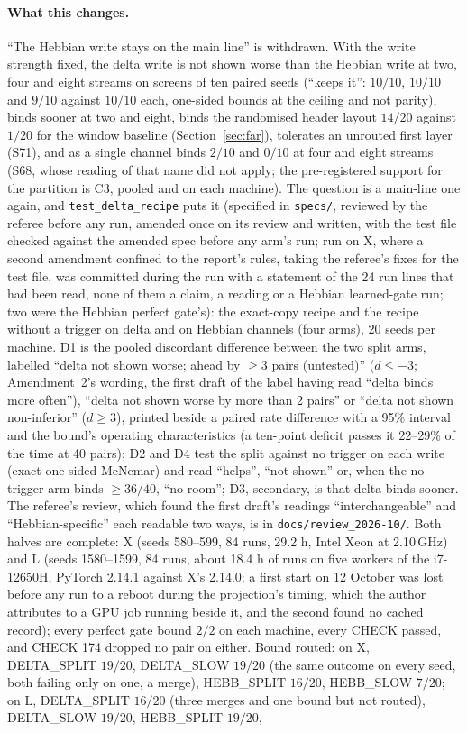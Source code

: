 \documentclass[11pt]{article}
\begin{document}
\paragraph{What this changes.} ``The Hebbian write stays on the main line'' is withdrawn. With the write strength fixed, the delta write is not shown worse than the Hebbian write at two, four and eight streams on screens of ten paired seeds (``keeps it'': $10/10$, $10/10$ and $9/10$ against $10/10$ each, one-sided bounds at the ceiling and not parity), binds sooner at two and eight, binds the randomised header layout $14/20$ against $1/20$ for the window baseline (Section~\ref{sec:far}), tolerates an unrouted first layer (S71), and as a single channel binds $2/10$ and $0/10$ at four and eight streams (S68, whose reading of that name did not apply; the pre-registered support for the partition is C3, pooled and on each machine). The question is a main-line one again, and \texttt{test\_delta\_recipe} puts it (specified in \texttt{specs/}, reviewed by the referee before any run, amended once on its review and written, with the test file checked against the amended spec before any arm's run; run on X, where a second amendment confined to the report's rules, taking the referee's fixes for the test file, was committed during the run with a statement of the 24 run lines that had been read, none of them a claim, a reading or a Hebbian learned-gate run; two were the Hebbian perfect gate's): the exact-copy recipe and the recipe without a trigger on delta and on Hebbian channels (four arms), 20 seeds per machine. D1 is the pooled discordant difference between the two split arms, labelled ``delta not shown worse; ahead by $\geq 3$ pairs (untested)'' ($d \leq -3$; Amendment~2's wording, the first draft of the label having read ``delta binds more often''), ``delta not shown worse by more than 2 pairs'' or ``delta not shown non-inferior'' ($d \geq 3$), printed beside a paired rate difference with a 95\% interval and the bound's operating characteristics (a ten-point deficit passes it 22--29\% of the time at 40 pairs); D2 and D4 test the split against no trigger on each write (exact one-sided McNemar) and read ``helps'', ``not shown'' or, when the no-trigger arm binds $\geq 36/40$, ``no room''; D3, secondary, is that delta binds sooner. The referee's review, which found the first draft's readings ``interchangeable'' and ``Hebbian-specific'' each readable two ways, is in \texttt{docs/review\_2026-10/}. Both halves are complete: X (seeds 580--599, 84 runs, 29.2 h, Intel Xeon at 2.10\,GHz) and L (seeds 1580--1599, 84 runs, about 18.4 h of runs on five workers of the i7-12650H, PyTorch 2.14.1 against X's 2.14.0; a first start on 12 October was lost before any run to a reboot during the projection's timing, which the author attributes to a GPU job running beside it, and the second found no cached record); every perfect gate bound $2/2$ on each machine, every CHECK passed, and CHECK 174 dropped no pair on either. Bound routed: on X, DELTA\_SPLIT $19/20$, DELTA\_SLOW $19/20$ (the same outcome on every seed, both failing only on one, a merge), HEBB\_SPLIT $16/20$, HEBB\_SLOW $7/20$; on L, DELTA\_SPLIT $16/20$ (three merges and one bound but not routed), DELTA\_SLOW $19/20$, HEBB\_SPLIT $19/20$, 
\end{document}
